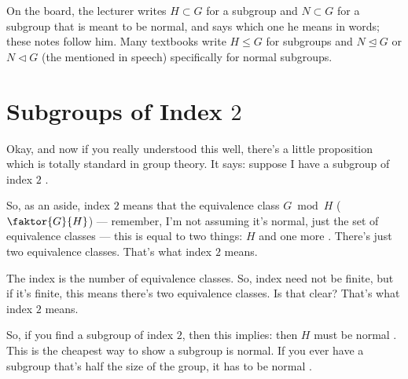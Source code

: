 \begin{aiNote}
On the board, the lecturer writes $H \subset G$ for a subgroup and $N \subset G$ for a subgroup that is meant to be normal, and says which one he means in words; these notes follow him. Many textbooks write $H \le G$ for subgroups and $N \trianglelefteq G$ or $N \triangleleft G$ (the  mentioned in speech) specifically for normal subgroups.
\end{aiNote}

\section{Subgroups of Index \texorpdfstring{$2$}{2}}

\begin{speech}[00:09:50 - 00:11:05]
Okay, and now if you really understood this well, there's a little proposition which is totally standard in group theory. It says: suppose I have a subgroup of index $2$ .

So, as an aside, index $2$ means that the equivalence class $G \bmod H$ ($\faktor{G}{H}$) --- remember, I'm not assuming it's normal, just the set of equivalence classes --- this is equal to two things: $H$ and one more . There's just two equivalence classes. That's what index $2$ means.

The index is the number of equivalence classes. So, index need not be finite, but if it's finite, this means there's two equivalence classes. Is that clear? That's what index $2$ means.

So, if you find a subgroup of index $2$, then this implies: then $H$ must be normal . This is the cheapest way to show a subgroup is normal. If you ever have a subgroup that's half the size of the group, it has to be normal .
\end{speech}

